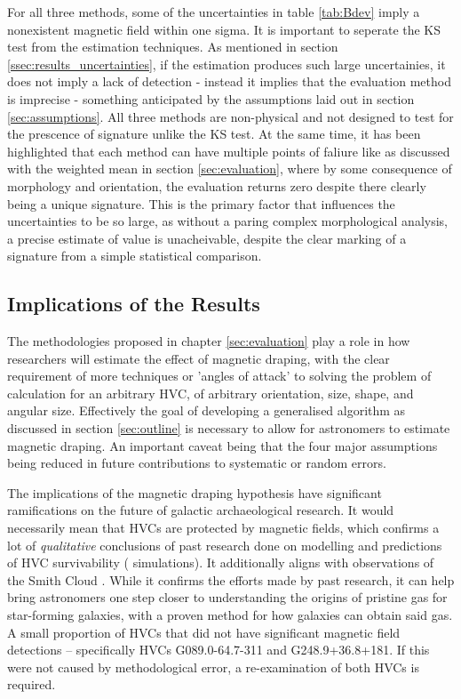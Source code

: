 For all three methods, some of the uncertainties in table \ref{tab:Bdev} imply a nonexistent magnetic field within one sigma. It is important to seperate the KS test from the estimation techniques. As mentioned in section \ref{ssec:results_uncertainties}, if the estimation produces such large uncertainies, it does not imply a lack of detection - instead it implies that the evaluation method is imprecise - something anticipated by the assumptions laid out in section \ref{sec:assumptions}. All three methods are non-physical and not designed to test for the prescence of signature unlike the KS test. At the same time, it has been highlighted that each method can have multiple points of faliure like as discussed with the weighted mean in section \ref{sec:evaluation}, where by some consequence of morphology and orientation, the evaluation returns zero despite there clearly being a unique signature. This is the primary factor that influences the uncertainties to be so large, as without a paring complex morphological analysis, a precise estimate of value is unacheivable, despite the clear marking of a signature from a simple statistical comparison.

\subsection{Implications of the Results}
\label{ssec:B4}

The methodologies proposed in chapter \ref{sec:evaluation} play a role in how researchers will estimate the effect of magnetic draping, with the clear requirement of more techniques or 'angles of attack' to solving the problem of calculation for an arbitrary HVC, of arbitrary orientation, size, shape, and angular size. Effectively the goal of developing a generalised algorithm as discussed in section \ref{sec:outline} is necessary to allow for astronomers to estimate magnetic draping. An important caveat being that the four major assumptions being reduced in future contributions to systematic or random errors.


The implications of the magnetic draping hypothesis have significant ramifications on the future of galactic archaeological research. It would necessarily mean that HVCs are protected by magnetic fields, which confirms a lot of \textit{qualitative} conclusions of past research done on modelling and predictions of HVC survivability (\citeauthor{ID23} simulations). It additionally aligns with observations of the Smith Cloud \citep{ID5, ID26}. While it confirms the efforts made by past research, it can help bring astronomers one step closer to understanding the origins of pristine gas for star-forming galaxies, with a proven method for how galaxies can obtain said gas. A small proportion of HVCs that did not have significant magnetic field detections – specifically HVCs G089.0-64.7-311 and G248.9+36.8+181. If this were not caused by methodological error, a re-examination of both HVCs is required.


